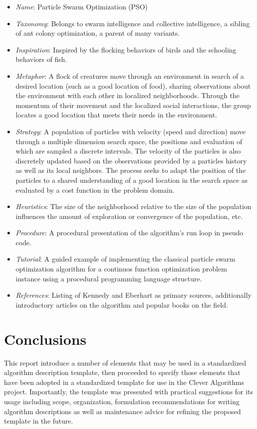 \documentclass[a4paper, 11pt]{article}
\begin{document}
\begin{itemize}
	\item \emph{Name}: Particle Swarm Optimization (PSO)
	\item \emph{Taxonomy}: Belongs to swarm intelligence and collective intelligence, a sibling of ant colony optimization, a parent of many variants.
	\item \emph{Inspiration}: Inspired by the flocking behaviors of birds and the schooling behaviors of fish.
	\item \emph{Metaphor}: A flock of creatures move through an environment in search of a desired location (such as a good location of food), sharing observations about the environment with each other in localized neighborhoods. Through the momentum of their movement and the localized social interactions, the group locates a good location that meets their needs in the environment. 
	\item \emph{Strategy}: A population of particles with velocity (speed and direction) move through a multiple dimension search space, the positions and evaluation of which are sampled a discrete intervals. The velocity of the particles is also discretely updated based on the observations provided by a particles history as well as its local neighbors. The process seeks to adapt the position of the particles to a shared understanding of a good location in the search space as evaluated by a cost function in the problem domain.
	\item \emph{Heuristics}: The size of the neighborhood relative to the size of the population influences the amount of exploration or convergence of the population, etc.
	\item \emph{Procedure}: A procedural presentation of the algorithm's run loop in pseudo code.
	\item \emph{Tutorial}: A guided example of implementing the classical particle swarm optimization algorithm for a continuos function optimization problem instance using a procedural programming language structure.
	\item \emph{References}: Listing of Kennedy and Eberhart as primary sources, additionally introductory articles on the algorithm and popular books on the field.
\end{itemize}

\section{Conclusions}
\label{sec:conclusions}
This report introduce a number of elements that may be used in a standardized algorithm description template, then proceeded to specify those elements that have been adopted in a standardized template for use in the Clever Algorithms project. Importantly, the template was presented with practical suggestions for its usage including scope, organization, formulation recommendations for writing algorithm descriptions as well as maintenance advice for refining the proposed template in the future.
\end{document}
